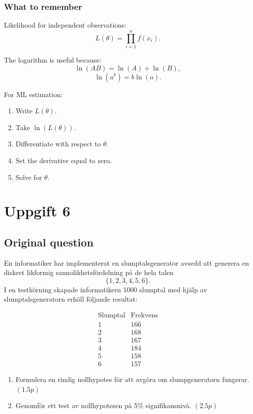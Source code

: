 \documentclass[10pt]{article}
\begin{document}
\subsubsection*{What to remember}

Likelihood for independent observations:
\[
L(\theta)
=
\prod_{i=1}^{n} f(x_i).
\]

The logarithm is useful because:
\[
\ln(AB)=\ln(A)+\ln(B),
\]
\[
\ln(a^b)=b\ln(a).
\]

For ML estimation:
\begin{enumerate}
\item Write \(L(\theta)\).
\item Take \(\ln(L(\theta))\).
\item Differentiate with respect to \(\theta\).
\item Set the derivative equal to zero.
\item Solve for \(\theta\).
\end{enumerate}

\section*{Uppgift 6}

\subsection*{Original question}

En informatiker har implementerat en
slumptalsgenerator avsedd att generera en diskret
likformig sannolikhetsfördelning på de hela talen
\[
\{1,2,3,4,5,6\}.
\]
I en testkörning skapade informatikern 1000 slumptal
med hjälp av slumptalsgeneratorn erhöll följande
resultat:

\[
\begin{array}{c|c}
\text{Slumptal} & \text{Frekvens}\\
\hline
1 & 166\\
2 & 168\\
3 & 167\\
4 & 184\\
5 & 158\\
6 & 157
\end{array}
\]

\begin{enumerate}[label=\alph*)]
\item Formulera en rimlig nollhypotes för att avgöra
om slumpgeneratorn fungerar. \((1.5p)\)

\item Genomför ett test av nollhypotesen på
5\% signifikansnivå. \((2.5p)\)
\end{enumerate}
\end{document}
